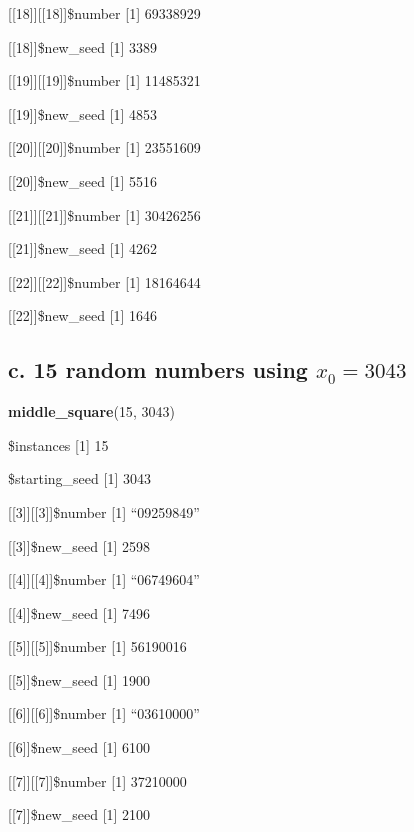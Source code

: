 \documentclass[]{article}
\newenvironment{Shaded}{\begin{snugshade}}{\end{snugshade}}
\newcommand{\KeywordTok}[1]{\textcolor[rgb]{0.13,0.29,0.53}{\textbf{{#1}}}}
\newcommand{\DecValTok}[1]{\textcolor[rgb]{0.00,0.00,0.81}{{#1}}}
\newcommand{\NormalTok}[1]{{#1}}
\begin{document}
{[}{[}18{]}{]}{[}{[}18{]}{]}\$number {[}1{]} 69338929

{[}{[}18{]}{]}\$new\_seed {[}1{]} 3389

{[}{[}19{]}{]}{[}{[}19{]}{]}\$number {[}1{]} 11485321

{[}{[}19{]}{]}\$new\_seed {[}1{]} 4853

{[}{[}20{]}{]}{[}{[}20{]}{]}\$number {[}1{]} 23551609

{[}{[}20{]}{]}\$new\_seed {[}1{]} 5516

{[}{[}21{]}{]}{[}{[}21{]}{]}\$number {[}1{]} 30426256

{[}{[}21{]}{]}\$new\_seed {[}1{]} 4262

{[}{[}22{]}{]}{[}{[}22{]}{]}\$number {[}1{]} 18164644

{[}{[}22{]}{]}\$new\_seed {[}1{]} 1646

\subsection{\texorpdfstring{c. 15 random numbers using
\(x_0 = 3043\)}{c. 15 random numbers using x\_0 = 3043}}\label{c.-15-random-numbers-using-x_0-3043}

\begin{Shaded}
\begin{Highlighting}[]
\KeywordTok{middle_square}\NormalTok{(}\DecValTok{15}\NormalTok{, }\DecValTok{3043}\NormalTok{)}
\end{Highlighting}
\end{Shaded}

\$instances {[}1{]} 15

\$starting\_seed {[}1{]} 3043

{[}{[}3{]}{]}{[}{[}3{]}{]}\$number {[}1{]} ``09259849''

{[}{[}3{]}{]}\$new\_seed {[}1{]} 2598

{[}{[}4{]}{]}{[}{[}4{]}{]}\$number {[}1{]} ``06749604''

{[}{[}4{]}{]}\$new\_seed {[}1{]} 7496

{[}{[}5{]}{]}{[}{[}5{]}{]}\$number {[}1{]} 56190016

{[}{[}5{]}{]}\$new\_seed {[}1{]} 1900

{[}{[}6{]}{]}{[}{[}6{]}{]}\$number {[}1{]} ``03610000''

{[}{[}6{]}{]}\$new\_seed {[}1{]} 6100

{[}{[}7{]}{]}{[}{[}7{]}{]}\$number {[}1{]} 37210000

{[}{[}7{]}{]}\$new\_seed {[}1{]} 2100
\end{document}
